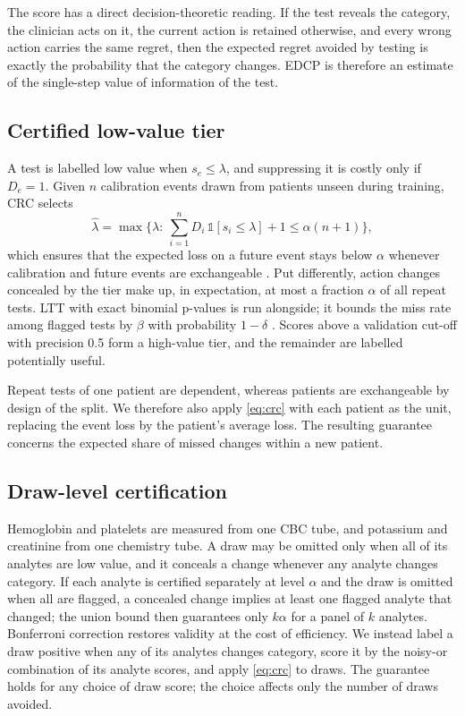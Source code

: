 \documentclass[conference]{IEEEtran}
\begin{document}
The score has a direct decision-theoretic reading. If the test reveals the category, the clinician acts on it, the current action is retained otherwise, and every wrong action carries the same regret, then the expected regret avoided by testing is exactly the probability that the category changes. EDCP is therefore an estimate of the single-step value of information of the test.

\subsection{Certified low-value tier}
A test is labelled low value when $s_e\le\lambda$, and suppressing it is costly only if $D_e=1$. Given $n$ calibration events drawn from patients unseen during training, CRC selects
\begin{equation}
\hat\lambda=\max\Big\{\lambda:\ \textstyle\sum_{i=1}^{n}D_i\,\mathbb{1}[s_i\le\lambda]+1\le\alpha(n+1)\Big\},
\label{eq:crc}
\end{equation}
which ensures that the expected loss on a future event stays below $\alpha$ whenever calibration and future events are exchangeable \cite{angelopoulos2024crc}. Put differently, action changes concealed by the tier make up, in expectation, at most a fraction $\alpha$ of all repeat tests. LTT with exact binomial p-values is run alongside; it bounds the miss rate among flagged tests by $\beta$ with probability $1-\delta$ \cite{angelopoulos2021ltt}. Scores above a validation cut-off with precision 0.5 form a high-value tier, and the remainder are labelled potentially useful.

Repeat tests of one patient are dependent, whereas patients are exchangeable by design of the split. We therefore also apply \eqref{eq:crc} with each patient as the unit, replacing the event loss by the patient's average loss. The resulting guarantee concerns the expected share of missed changes within a new patient.

\subsection{Draw-level certification}
Hemoglobin and platelets are measured from one CBC tube, and potassium and creatinine from one chemistry tube. A draw may be omitted only when all of its analytes are low value, and it conceals a change whenever any analyte changes category. If each analyte is certified separately at level $\alpha$ and the draw is omitted when all are flagged, a concealed change implies at least one flagged analyte that changed; the union bound then guarantees only $k\alpha$ for a panel of $k$ analytes. Bonferroni correction restores validity at the cost of efficiency. We instead label a draw positive when any of its analytes changes category, score it by the noisy-or combination of its analyte scores, and apply \eqref{eq:crc} to draws. The guarantee holds for any choice of draw score; the choice affects only the number of draws avoided.
\end{document}
